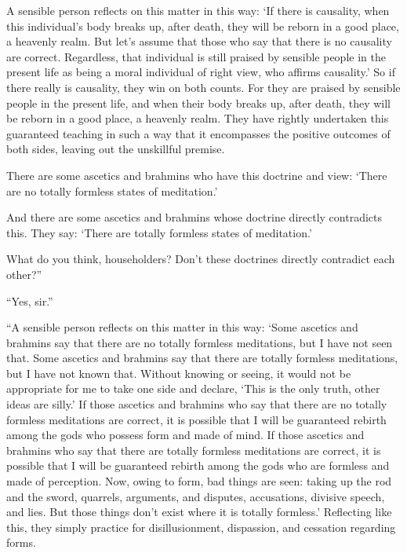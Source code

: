 \documentclass[12pt,openany]{book}%
\begin{document}
A sensible person reflects on this matter in this way: ‘If there is causality, when this individual’s body breaks up, after death, they will be reborn in a good place, a heavenly realm. But let’s assume that those who say that there is no causality are correct. Regardless, that individual is still praised by sensible people in the present life as being a moral individual of right view, who affirms causality.’ So if there really is causality, they win on both counts. For they are praised by sensible people in the present life, and when their body breaks up, after death, they will be reborn in a good place, a heavenly realm. They have rightly undertaken this guaranteed teaching in such a way that it encompasses the positive outcomes of both sides, leaving out the unskillful premise. 

There are some ascetics and brahmins who have this doctrine and view: ‘There are no totally formless states of meditation.’ 

And there are some ascetics and brahmins whose doctrine directly contradicts this. They say: ‘There are totally formless states of meditation.’ 

What do you think, householders? Don’t these doctrines directly contradict each other?” 

“Yes, sir.” 

“A sensible person reflects on this matter in this way: ‘Some ascetics and brahmins say that there are no totally formless meditations, but I have not seen that. Some ascetics and brahmins say that there are totally formless meditations, but I have not known that. Without knowing or seeing, it would not be appropriate for me to take one side and declare, ‘This is the only truth, other ideas are silly.’ If those ascetics and brahmins who say that there are no totally formless meditations are correct, it is possible that I will be guaranteed rebirth among the gods who possess form and made of mind. If those ascetics and brahmins who say that there are totally formless meditations are correct, it is possible that I will be guaranteed rebirth among the gods who are formless and made of perception. Now, owing to form, bad things are seen: taking up the rod and the sword, quarrels, arguments, and disputes, accusations, divisive speech, and lies. But those things don’t exist where it is totally formless.’ Reflecting like this, they simply practice for disillusionment, dispassion, and cessation regarding forms. 
\end{document}
